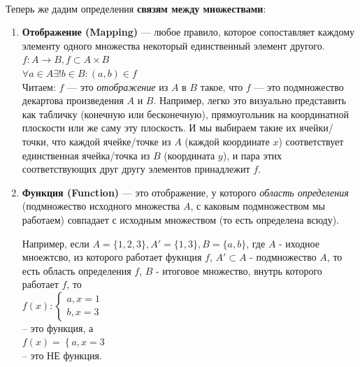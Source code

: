 \documentclass{book}
\begin{document}
$ $\\

Теперь же дадим определения \textbf{связям между множествами}:

\begin{enumerate}[label=\arabic*., parsep=4pt, itemsep=4pt, topsep=4pt, partopsep=0pt]

\item \textbf{Отображение (Mapping)} — любое правило, которое сопоставляет каждому элементу одного множества некоторый единственный элемент другого. \\

$f: A \to B, f \subset A \times  B $ \\
$\forall a \in  A \exists ! b \in B: (a,b) \in f$ \\

Читаем: $f$ — это \textit{отображение} из $A$ в $B$ такое, что $f$ — это подмножество декартова произведения $A$ и $B$. Например, легко это визуально представить как табличку (конечную или бесконечную), прямоугольник на координатной плоскости или же саму эту плоскость. И мы выбираем такие их ячейки/точки, что каждой ячейке/точке из $A$ (каждой координате $x$) соответствует единственная ячейка/точка из $B$ (координата $y$), и пара этих соответствующих друг другу элементов принадлежит $f$.\\

\item \textbf{Функция (Function)} — это отображение, у которого \textit{область определения} (подмножество исходного множества $A$, с каковым подмножеством мы работаем) совпадает с исходным множеством (то есть определена всюду).  

Например, если $A = \{1,2,3\}, A' = \{1,3\}, B = \{a,b\}$, где $A$ - иходное мноежтсво, из которого работает фукнция $f$, $A' \subset A$ - подмножество $A$, то есть область определения $f$, $B$ - итоговое множество, внутрь которого работает $f$, то \\

$f(x): \left\{ \begin{matrix} 
a, x = 1 \\
b, x = 3
\end{matrix} \right.$ \\

-- это функция, а \\

$f(x) = \left\{ a, x = 3\right.$ \\

-- это НЕ функция. \\


\end{enumerate}
\end{document}
